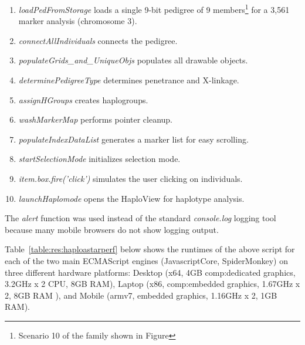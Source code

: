 \begin{spacing}{1}
\begin{enumerate}
\item{\textit{loadPedFromStorage} loads a single 9-bit pedigree of 9 members\footnote{Scenario 10 of the family shown in Figure} for a 3,561 marker analysis (chromosome 3).}
\item{\textit{connectAllIndividuals} connects the pedigree.}
\item{\textit{populateGrids\_and\_UniqueObjs} populates all drawable objects.}
\item{\textit{determinePedigreeType} determines penetrance and X-linkage.}
\item{\textit{assignHGroups} creates haplogroups.}
\item{\textit{washMarkerMap} performs pointer cleanup.}
\item{\textit{populateIndexDataList} generates a marker list for easy scrolling.}
\item{\textit{startSelectionMode} initializes selection mode.}
\item{\textit{item.box.fire('click')} simulates the user clicking on individuals.}
\item{\textit{launchHaplomode} opens the HaploView for haplotype analysis.}
\end{enumerate}
\end{spacing}

\vfill

The \textit{alert} function was used instead of the standard \textit{console.log} logging tool because many mobile browsers do not show logging output. 

Table~\ref{table:res:haploastarperf} below shows the runtimes of the above script for each of the two main ECMAScript engines (JavascriptCore, SpiderMonkey) on three different hardware platforms: Desktop (x64, 4GB \gls{comp:dedicated graphics}, 3.2GHz x 2 CPU, 8GB RAM), Laptop (x86, \gls{comp:embedded graphics}, 1.67GHz x 2, 8GB RAM ), and Mobile (armv7, embedded graphics, 1.16GHz x 2, 1GB RAM).


